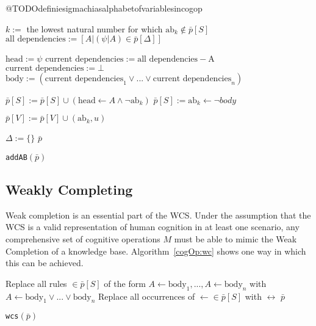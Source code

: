 @TODOdefiniesigmachiasalphabetofvariablesincogop

\begin{algorithm}[H] \label{cogOp:addAB}
\SetAlgoLined
{}
{
{
$k:=$ the lowest natural number for which $\text{ab}_k \notin \bar{p}[S]$\;
$\text{all dependencies}:= [A | (\psi|A) \in \bar{p}[\Delta]]$\;

{
$\text{head}:=\psi$\;
$\text{current dependencies}:= \text{all dependencies} - \text{A}$\;
{
$\text{current dependencies}:=\bot$\;
}
$\text{body}:=(\text{current dependencies}_1 \lor ... \lor \text{current dependencies}_n)$\;

$\bar{p}[S]:= \bar{p}[S] \cup (\text{head} \leftarrow A \land \lnot \text{ab}_k)$\;
$\bar{p}[S]:= \text{ab}_k \leftarrow \lnot body$\;

}
$\bar{p}[V]:= \bar{p}[V] \cup (\text{ab}_k,u)$\;
}
$\Delta:=\{\}$\;
\Return $\bar{p}$
}
\caption{\texttt{addAB}$(\bar{p})$}
\end{algorithm}

\subsection{Weakly Completing}


Weak completion is an essential part of the WCS. Under the assumption that the WCS is a valid representation of human cognition in at least one scenario, any comprehensive set of cognitive operations $M$ must be able to mimic the Weak Completion of a knowledge base. Algorithm~\ref{cogOp:wc} shows one way in which this can be achieved.

\begin{algorithm}[H] \label{cogOp:wcs}
\SetAlgoLined
{}
{
Replace all rules $\in \bar{p}[S]$ of the form $A\leftarrow \text{body}_1,...,A\leftarrow \text{body}_n$ with $A\leftarrow \text{body}_1 \lor ... \lor \text{body}_n$ \;
Replace all occurrences of $\leftarrow \in \bar{p}[S]$ with $\leftrightarrow$ \;
\Return $\bar{p}$
}

\caption{\texttt{wcs}$(\bar{p})$}
\end{algorithm}



